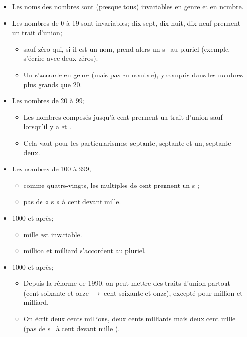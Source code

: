 \documentclass[a4paper,10pt]{article}
\begin{document}
\begin{itemize}
    \item Les noms des nombres sont (presque tous) invariables en genre et en nombre.
    \item Les nombres de 0 à 19 sont invariables; dix-sept, dix-huit, dix-neuf prennent un trait d’union;
    \begin{itemize}
        \item sauf zéro qui, si il est un nom, prend alors un \og s \fg\ au pluriel (exemple, s'écrire avec deux zéros). 
        \item Un s'accorde en genre (mais pas en nombre), y compris dans les nombres plus grands que 20.
    \end{itemize}
    \item Les nombres de 20 à 99;
    \begin{itemize}
        \item Les nombres composés jusqu'à cent prennent un trait d'union sauf lorsqu'il y a \og et \fg.
        \item Cela vaut pour les particularismes: septante, septante et un, septante-deux.
    \end{itemize}
    \item Les nombres de 100 à 999;
    \begin{itemize}
        \item comme quatre-vingts, les multiples de cent prennent un \og s \fg;
        \item pas de « s » à cent devant mille.
    \end{itemize}
    \item 1000 et après;
    \begin{itemize}
        \item mille est invariable.
        \item million et milliard s'accordent au pluriel.
    \end{itemize}
    \item 1000 et après;
    \begin{itemize}
        \item Depuis la réforme de 1990, on peut mettre des traits d'union partout (cent soixante et onze $ \rightarrow $ cent-soixante-et-onze), excepté pour million et milliard.
        \item On écrit deux cents millions, deux cents milliards mais deux cent mille (pas de \og s \fg\ à \og cent devant mille \fg).
    \end{itemize}
\end{itemize}
\end{document}
